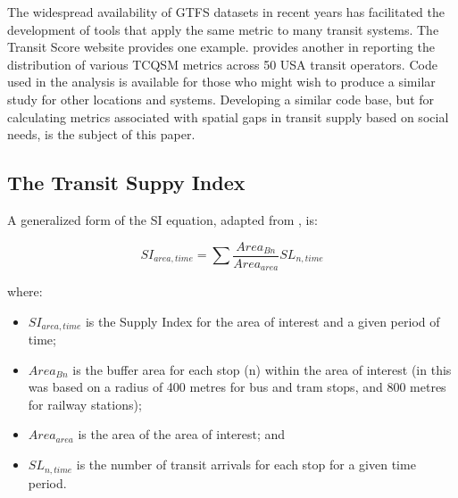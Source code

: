 \documentclass[preprint, 3p,
authoryear]{elsarticle} %
\begin{document}
The widespread availability of GTFS datasets in recent years has
facilitated the development of tools that apply the same metric to many
transit systems. The Transit Score website provides one example.
\citet{Wong:2013aa} provides another in reporting the distribution of
various TCQSM metrics across 50 USA transit operators. Code used in the
\citet{Wong:2013aa} analysis is available for those who might wish to
produce a similar study for other locations and systems. Developing a
similar code base, but for calculating metrics associated with spatial
gaps in transit supply based on social needs, is the subject of this
paper.

\subsection{The Transit Suppy Index}\label{the-transit-suppy-index}

A generalized form of the SI equation, adapted from
\citet{currie2010identifying}, is:

\[SI_{area, time} = \sum{\frac{Area_{Bn}}{Area_{area}}SL_{n, time}}\]

where:

\begin{itemize}
\item
  \(SI_{area, time}\) is the Supply Index for the area of interest and a
  given period of time;
\item
  \(Area_{Bn}\) is the buffer area for each stop (n) within the area of
  interest (in \citet{currie2010identifying} this was based on a radius
  of 400 metres for bus and tram stops, and 800 metres for railway
  stations);
\item
  \(Area_{area}\) is the area of the area of interest; and
\item
  \(SL_{n,time}\) is the number of transit arrivals for each stop for a
  given time period.
\end{itemize}
\end{document}
